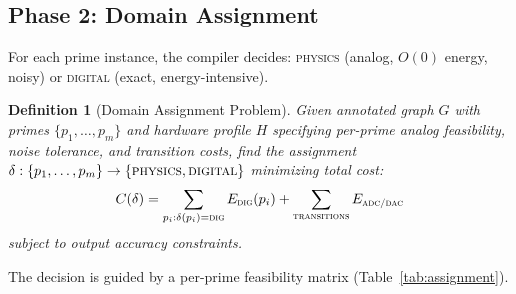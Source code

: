 \documentclass[11pt]{article}
\newtheorem{definition}{Definition}
\begin{document}
\subsection{Phase 2: Domain Assignment}
\label{sec:assignment}

For each prime instance, the compiler decides: \textsc{physics} (analog, $O(0)$ energy, noisy) or \textsc{digital} (exact, energy-intensive).

\begin{definition}[Domain Assignment Problem]
Given annotated graph $G$ with primes $\{p_1, \ldots, p_m\}$ and hardware profile $H$ specifying per-prime analog feasibility, noise tolerance, and transition costs, find the assignment $\delta: \{p_1, \ldots, p_m\} \to \{\textsc{physics}, \textsc{digital}\}$ minimizing total cost:
\begin{equation}
C(\delta) = \sum_{p_i: \delta(p_i)=\textsc{dig}} E_{\textsc{dig}}(p_i) + \sum_{\textsc{transitions}} E_{\textsc{adc/dac}}
\end{equation}
subject to output accuracy constraints.
\end{definition}

The decision is guided by a per-prime feasibility matrix (Table~\ref{tab:assignment}).
\end{document}
